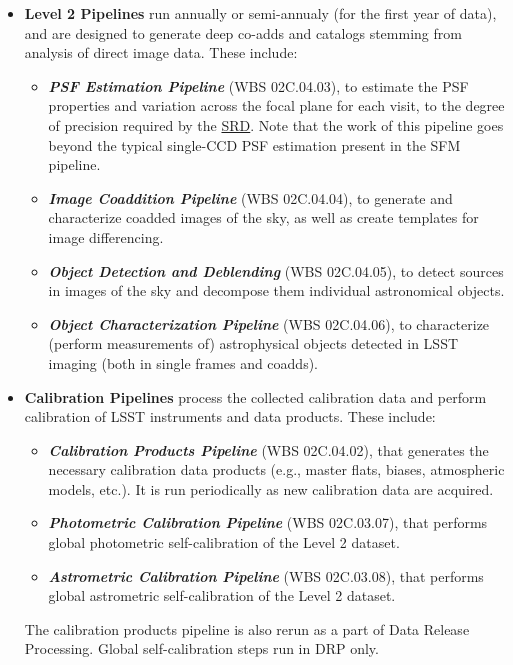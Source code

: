 \documentclass[12pt]{article}
\newcommand{\ds}[2]{{\color{blue} \href{https://docushare.lsstcorp.org/docushare/dsweb/Get/#1}{#2}}\xspace}
\newcommand{\SRD}{\ds{LPM-17}{SRD}}
\newcommand{\wbsPSF}{WBS 02C.04.03}
\newcommand{\wbsCoadd}{WBS 02C.04.04}
\newcommand{\wbsDetDeblend}{WBS 02C.04.05}
\newcommand{\wbsObjChar}{WBS 02C.04.06}
\newcommand{\wbsCPP}{WBS 02C.04.02}
\newcommand{\wbsPhotoCal}{WBS 02C.03.07}
\newcommand{\wbsAstroCal}{WBS 02C.03.08}
\begin{document}
\begin{itemize}
    \item {\bf Level 2 Pipelines} run annually or semi-annualy (for the first year of data), and are designed to generate deep co-adds and catalogs stemming from analysis of direct image data.  These include:
    \begin{itemize}
        \item {\bf \emph{PSF Estimation Pipeline}} (\wbsPSF), to estimate the PSF properties and variation across the focal plane for each visit, to the degree of precision required by the \SRD. Note that the work of this pipeline goes beyond the typical single-CCD PSF estimation present in the SFM pipeline.
        \item {\bf \emph{Image Coaddition Pipeline}} (\wbsCoadd), to generate and characterize coadded images of the sky, as well as create templates for image differencing.
        \item {\bf \emph{Object Detection and Deblending}} (\wbsDetDeblend), to detect sources in images of the sky and decompose them individual astronomical objects.
        \item {\bf \emph{Object Characterization Pipeline}} (\wbsObjChar), to characterize (perform measurements of) astrophysical objects detected in LSST imaging (both in single frames and coadds).
    \end{itemize}
    
    \item {\bf Calibration Pipelines} process the collected calibration data and perform calibration of LSST instruments and data products. These include:
    \begin{itemize}
        \item {\bf \emph{Calibration Products Pipeline}} (\wbsCPP), that generates the necessary calibration data products (e.g., master flats, biases, atmospheric models, etc.). It is run periodically as new calibration data are acquired.
        \item {\bf \emph{Photometric Calibration Pipeline}} (\wbsPhotoCal), that performs global photometric self-calibration of the Level 2 dataset.
        \item {\bf \emph{Astrometric Calibration Pipeline}} (\wbsAstroCal), that performs global astrometric self-calibration of the Level 2 dataset.
    \end{itemize}
    The calibration products pipeline is also rerun as a part of Data Release Processing. Global self-calibration steps run in DRP only.


\end{itemize}
\end{document}
